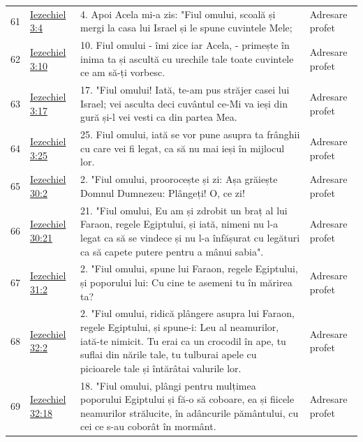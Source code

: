 \documentclass[12pt,a4paper,twoside,openany]{book}
\begin{document}
\begin{longtable}{L{0.8cm}L{1.2cm}L{11.9cm}L{0.8cm}}
61 & \href{https://bibliaortodoxa.ro/carte.php?id=33\&cap=3\#4}{Iezechiel 3:4} & 4. Apoi Acela mi-a zis: "Fiul omului, scoală și mergi la casa lui Israel și le spune cuvintele Mele; & Adresare profet \\
62 & \href{https://bibliaortodoxa.ro/carte.php?id=33\&cap=3\#10}{Iezechiel 3:10} & 10. Fiul omului - îmi zice iar Acela, - primește în inima ta și ascultă cu urechile tale toate cuvintele ce am să-ți vorbesc. & Adresare profet \\
63 & \href{https://bibliaortodoxa.ro/carte.php?id=33\&cap=3\#17}{Iezechiel 3:17} & 17. "Fiul omului! Iată, te-am pus străjer casei lui Israel; vei asculta deci cuvântul ce-Mi va ieși din gură și-l vei vesti ca din partea Mea. & Adresare profet \\
64 & \href{https://bibliaortodoxa.ro/carte.php?id=33\&cap=3\#25}{Iezechiel 3:25} & 25. Fiul omului, iată se vor pune asupra ta frânghii cu care vei fi legat, ca să nu mai ieși în mijlocul lor. & Adresare profet \\
65 & \href{https://bibliaortodoxa.ro/carte.php?id=33\&cap=30\#2}{Iezechiel 30:2} & 2. "Fiul omului, proorocește și zi: Așa grăiește Domnul Dumnezeu: Plângeți! O, ce zi! & Adresare profet \\
66 & \href{https://bibliaortodoxa.ro/carte.php?id=33\&cap=30\#21}{Iezechiel 30:21} & 21. "Fiul omului, Eu am și zdrobit un braț al lui Faraon, regele Egiptului, și iată, nimeni nu l-a legat ca să se vindece și nu l-a înfășurat cu legături ca să capete putere pentru a mânui sabia". & Adresare profet \\
67 & \href{https://bibliaortodoxa.ro/carte.php?id=33\&cap=31\#2}{Iezechiel 31:2} & 2. "Fiul omului, spune lui Faraon, regele Egiptului, și poporului lui: Cu cine te asemeni tu în mărirea ta? & Adresare profet \\
68 & \href{https://bibliaortodoxa.ro/carte.php?id=33\&cap=32\#2}{Iezechiel 32:2} & 2. "Fiul omului, ridică plângere asupra lui Faraon, regele Egiptului, și spune-i: Leu al neamurilor, iată-te nimicit. Tu erai ca un crocodil în ape, tu suflai din nările tale, tu tulburai apele cu picioarele tale și întărâtai valurile lor. & Adresare profet \\
69 & \href{https://bibliaortodoxa.ro/carte.php?id=33\&cap=32\#18}{Iezechiel 32:18} & 18. "Fiul omului, plângi pentru mulțimea poporului Egiptului și fă-o să coboare, ea și fiicele neamurilor strălucite, în adâncurile pământului, cu cei ce s-au coborât în mormânt. & Adresare profet \\

\end{longtable}
\end{document}
